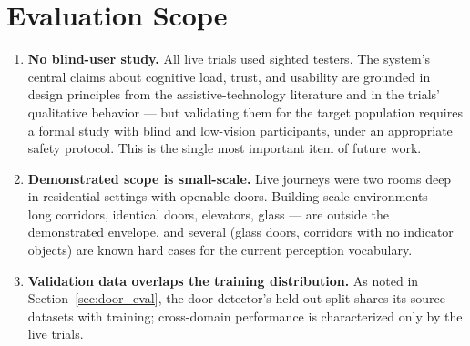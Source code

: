 \section{Evaluation Scope}

\begin{enumerate}[nosep]
  \item \textbf{No blind-user study.} All live trials used sighted testers.
        The system's central claims about cognitive load, trust, and usability
        are grounded in design principles from the assistive-technology
        literature and in the trials' qualitative behavior --- but validating
        them for the target population requires a formal study with blind and
        low-vision participants, under an appropriate safety protocol. This is
        the single most important item of future work.
  \item \textbf{Demonstrated scope is small-scale.} Live journeys were two rooms
        deep in residential settings with openable doors. Building-scale
        environments --- long corridors, identical doors, elevators, glass ---
        are outside the demonstrated envelope, and several (glass doors,
        corridors with no indicator objects) are known hard cases for the
        current perception vocabulary.
  \item \textbf{Validation data overlaps the training distribution.} As noted in
        Section~\ref{sec:door_eval}, the door detector's held-out split shares
        its source datasets with training; cross-domain performance is
        characterized only by the live trials.
\end{enumerate}